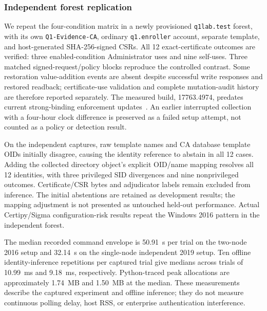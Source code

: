 \subsubsection{Independent forest replication}
We repeat the four-condition matrix in a newly provisioned \texttt{q1lab.test} forest, with its own \texttt{Q1-Evidence-CA}, ordinary \texttt{q1.enroller} account, separate template, and host-generated SHA-256-signed CSRs. All 12 exact-certificate outcomes are verified: three enabled-condition Administrator uses and nine self-uses. Three matched signed-request/policy blocks reproduce the controlled contrast. Some restoration value-addition events are absent despite successful write responses and restored readback; certificate-use validation and complete mutation-audit history are therefore reported separately. The measured build, 17763.4974, predates current strong-binding enforcement updates~\cite{microsoft2025strongbinding}. An earlier interrupted collection with a four-hour clock difference is preserved as a failed setup attempt, not counted as a policy or detection result.

On the independent captures, raw template names and CA database template OIDs initially disagree, causing the identity reference to abstain in all 12 cases. Adding the collected directory object's explicit OID/name mapping resolves all 12 identities, with three privileged SID divergences and nine nonprivileged outcomes. Certificate/CSR bytes and adjudicator labels remain excluded from inference. The initial abstentions are retained as development results; the mapping adjustment is not presented as untouched held-out performance. Actual Certipy/Sigma configuration-risk results repeat the Windows 2016 pattern in the independent forest.

The median recorded command envelope is 50.91~s per trial on the two-node 2016 setup and 32.14~s on the single-node independent 2019 setup. Ten offline identity-inference repetitions per captured trial give medians across trials of 10.99~ms and 9.18~ms, respectively. Python-traced peak allocations are approximately 1.74~MB and 1.50~MB at the median. These measurements describe the captured experiment and offline inference; they do not measure continuous polling delay, host RSS, or enterprise authentication interference.

